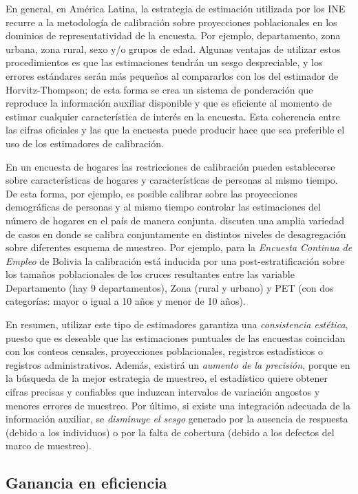 \documentclass[
  12pt,
]{book}
\begin{document}
En general, en América Latina, la estrategia de estimación utilizada por los INE recurre a la metodología de calibración sobre proyecciones poblacionales en los dominios de representatividad de la encuesta. Por ejemplo, departamento, zona urbana, zona rural, sexo y/o grupos de edad. Algunas ventajas de utilizar estos procedimientos es que las estimaciones tendrán un sesgo despreciable, y los errores estándares serán más pequeños al compararlos con los del estimador de Horvitz-Thompson; de esta forma se crea un sistema de ponderación que reproduce la información auxiliar disponible y que es eficiente al momento de estimar cualquier característica de interés en la encuesta. Esta coherencia entre las cifras oficiales y las que la encuesta puede producir hace que sea preferible el uso de los estimadores de calibración.

En un encuesta de hogares las restricciones de calibración pueden establecerse sobre características de hogares y características de personas al mismo tiempo. De esta forma, por ejemplo, es posible calibrar sobre las proyecciones demográficas de personas y al mismo tiempo controlar las estimaciones del número de hogares en el país de manera conjunta. \citet{Estevao_Sarndal_2006} discuten una amplia variedad de casos en donde se calibra conjuntamente en distintos niveles de desagregación sobre diferentes esquema de muestreo. Por ejemplo, para la \emph{Encuesta Continua de Empleo} de Bolivia la calibración está inducida por una post-estratificación sobre los tamaños poblacionales de los cruces resultantes entre las variable Departamento (hay 9 departamentos), Zona (rural y urbano) y PET (con dos categorías: mayor o igual a 10 años y menor de 10 años).

En resumen, utilizar este tipo de estimadores garantiza una \emph{consistencia estética}, puesto que es deseable que las estimaciones puntuales de las encuestas coincidan con los conteos censales, proyecciones poblacionales, registros estadísticos o registros administrativos. Además, existirá un \emph{aumento de la precisión}, porque en la búsqueda de la mejor estrategia de muestreo, el estadístico quiere obtener cifras precisas y confiables que induzcan intervalos de variación angostos y menores errores de muestreo. Por último, si existe una integración adecuada de la información auxiliar, se \emph{disminuye el sesgo} generado por la ausencia de respuesta (debido a los individuos) o por la falta de cobertura (debido a los defectos del marco de muestreo).

\hypertarget{ganancia-en-eficiencia}{%
\subsection{Ganancia en eficiencia}\label{ganancia-en-eficiencia}}
\end{document}
